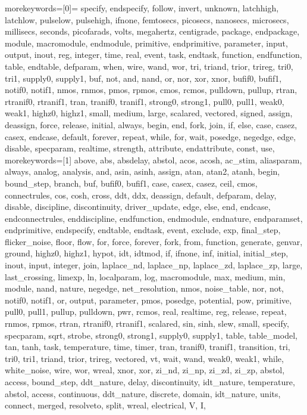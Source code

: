 %
	{
	morekeywords=[0]={ %
		specify, endspecify, follow, invert, unknown, latchhigh, latchlow, pulselow, pulsehigh, ifnone, femtosecs, picosecs, nanosecs, microsecs, millisecs, seconds, picofarads, volts, megahertz, centigrade, package, endpackage, module, macromodule, endmodule, primitive, endprimitive, parameter, input, output, inout, reg, integer, time, real, event, task, endtask, function, endfunction, table, endtable, defparam, when, wire, wand, wor, tri, triand, trior, trireg, tri0, tri1, supply0, supply1, buf, not, and, nand, or, nor, xor, xnor, bufif0, bufif1, notif0, notif1, nmos, rnmos, pmos, rpmos, cmos, rcmos, pulldown, pullup, rtran, rtranif0, rtranif1, tran, tranif0, tranif1, strong0, strong1, pull0, pull1, weak0, weak1, highz0, highz1, small, medium, large, scalared, vectored, signed, assign, deassign, force, release, initial, always, begin, end, fork, join, if, else, case, casez, casex, endcase, default, forever, repeat, while, for, wait, posedge, negedge, edge, disable, specparam, realtime, strength, attribute, endattribute, const, use},%
	morekeywords=[1]{%
		above, abs, absdelay, abstol, acos, acosh, ac_stim, aliasparam, always, analog, analysis, and, asin, asinh, assign, atan, atan2, atanh, begin, bound_step, branch, buf, bufif0, bufif1, case, casex, casez, ceil, cmos, connectrules, cos, cosh, cross, ddt, ddx, deassign, default, defparam, delay, disable, discipline, discontinuity, driver_update, edge, else, end, endcase, endconnectrules, enddiscipline, endfunction, endmodule, endnature, endparamset, endprimitive, endspecify, endtable, endtask, event, exclude, exp, final_step, flicker_noise, floor, flow, for, force, forever, fork, from, function, generate, genvar, ground, highz0, highz1, hypot, idt, idtmod, if, ifnone, inf, initial, initial_step, inout, input, integer, join, laplace_nd, laplace_np, laplace_zd, laplace_zp, large, last_crossing, limexp, ln, localparam, log, macromodule, max, medium, min, module, nand, nature, negedge, net_resolution, nmos, noise_table, nor, not, notif0, notif1, or, output, parameter, pmos, posedge, potential, pow, primitive, pull0, pull1, pullup, pulldown, pwr, rcmos, real, realtime, reg, release, repeat, rnmos, rpmos, rtran, rtranif0, rtranif1, scalared, sin, sinh, slew, small, specify, specparam, sqrt, strobe, strong0, strong1, supply0, supply1, table, table_model, tan, tanh, task, temperature, time, timer, tran, tranif0, tranif1, transition, tri, tri0, tri1, triand, trior, trireg, vectored, vt, wait, wand, weak0, weak1, while, white_noise, wire, wor, wreal, xnor, xor, zi_nd, zi_np, zi_zd, zi_zp, abstol, access, bound_step, ddt_nature, delay, discontinuity, idt_nature, temperature, abstol, access, continuous, ddt_nature, discrete, domain, idt_nature, units, connect, merged, resolveto, split, wreal, electrical, V, I},%
}

